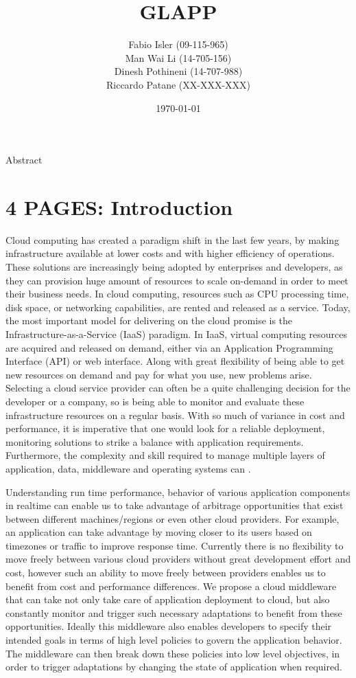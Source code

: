 \documentclass{seal_thesis}
\date{\today}
\title{GLAPP}
\subtitle{}
\author{
Fabio Isler \textmd{(09-115-965)} \\
Man Wai Li \textmd{(14-705-156)} \\
Dinesh Pothineni \textmd{(14-707-988)} \\
Riccardo Patane \textmd{(XX-XXX-XXX)}}
\begin{document}
\maketitle

\abstract
Abstract


\chapter{4 PAGES: Introduction}

Cloud computing has created a paradigm shift in the last few years, by making infrastructure available at lower costs and with higher efficiency of operations.
These solutions are increasingly being adopted by enterprises and developers, as they can provision huge amount of resources to scale on-demand in order to meet their business needs.
In cloud computing, resources such as CPU processing time, disk space, or networking capabilities, are rented and released as a service.
Today, the most important model for delivering on the cloud promise is the Infrastructure-as-a-Service (IaaS) paradigm.
In IaaS, virtual computing resources are acquired and released on demand, either via an Application Programming Interface (API) or web interface.
Along with great flexibility of being able to get new resources on demand and pay for what you use, new problems arise.
Selecting a cloud service provider can often be a quite challenging decision for the developer or a company, so is being able to monitor and evaluate these infrastructure resources on a regular basis.
With so much of variance in cost and performance, it is imperative that one would look for a reliable deployment, monitoring solutions to strike a balance with application requirements.
Furthermore, the complexity and skill required to manage multiple layers of application, data, middleware and operating systems can .

Understanding run time performance, behavior of various application components in realtime can enable us to take advantage of arbitrage opportunities that exist between different machines/regions or even other cloud providers.
For example, an application can take advantage by moving closer to its users based on timezones or traffic to improve response time.
Currently there is no flexibility to move freely between various cloud providers without great development effort and cost, however such an ability to move freely between providers enables us to benefit from cost and performance differences.
We propose a cloud middleware that can take not only take care of application deployment to cloud, but also constantly monitor and trigger such necessary adaptations to benefit from these opportunities.
Ideally this middleware also enables developers to specify their intended goals in terms of high level policies to govern the application behavior.
The middleware can then break down these policies into low level objectives, in order to trigger adaptations by changing the state of application when required.
\end{document}
